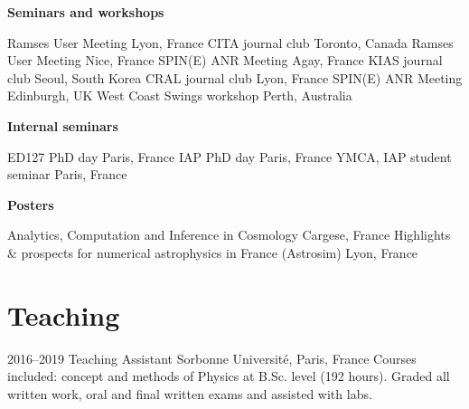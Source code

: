 \documentclass[]{cv-style}
\begin{document}
\textbf{Seminars and workshops}

\begin{entrylist}
{Ramses User Meeting}
{Lyon, France}
{CITA journal club}
{Toronto, Canada}
{Ramses User Meeting}
{Nice, France}
{SPIN(E) ANR Meeting}
{Agay, France}
{KIAS journal club}
{Seoul, South Korea}
{CRAL journal club}
{Lyon, France}
{SPIN(E) ANR Meeting}
{Edinburgh, UK}
{West Coast Swings workshop}
{Perth, Australia}
\end{entrylist}


\textbf{Internal seminars}

\begin{entrylist}
{ED127 PhD day}
{Paris, France}
{IAP PhD day}
{Paris, France}
{YMCA, IAP student seminar}
{Paris, France}
\end{entrylist}


\textbf{Posters}

\begin{entrylist}
{Analytics, Computation and Inference in Cosmology}
{Cargese, France}
{Highlights \& prospects for numerical astrophysics in France (Astrosim)}
{Lyon, France}

\end{entrylist}

\section{Teaching}
\begin{entrylist}
\entry
{2016--2019}
{Teaching Assistant}
{Sorbonne Université, Paris, France}
{Courses included: concept and methods of Physics at B.Sc. level (192 hours). Graded all written work, oral and final written exams and assisted with labs.}
\end{entrylist}
\end{document}

